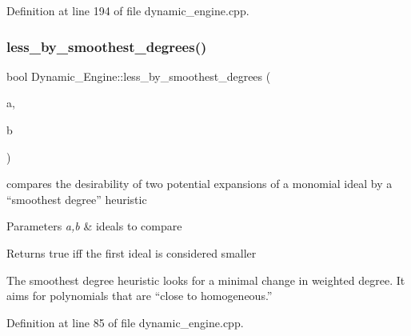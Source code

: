 Definition at line 194 of file dynamic\+\_\+engine.\+cpp.

\mbox{\label{namespace_dynamic___engine_aa27b3fbb646d1d0f5d35de5a69e1cb29}} 
\subsubsection{\texorpdfstring{less\+\_\+by\+\_\+smoothest\+\_\+degrees()}{less\_by\_smoothest\_degrees()}}
{\footnotesize\ttfamily bool Dynamic\+\_\+\+Engine\+::less\+\_\+by\+\_\+smoothest\+\_\+degrees (\begin{DoxyParamCaption}\item[{\hyperlink{group___g_b_computation_class_dynamic___engine_1_1_p_p___with___ideal}{P\+P\+\_\+\+With\+\_\+\+Ideal} \&}]{a,  }\item[{\hyperlink{group___g_b_computation_class_dynamic___engine_1_1_p_p___with___ideal}{P\+P\+\_\+\+With\+\_\+\+Ideal} \&}]{b }\end{DoxyParamCaption})}



compares the desirability of two potential expansions of a monomial ideal by a ``smoothest degree'' heuristic 


\begin{DoxyParams}{Parameters}
{\em a,b} & ideals to compare \\
\hline
\end{DoxyParams}
\begin{DoxyReturn}{Returns}
{\ttfamily true} iff the first ideal is considered smaller
\end{DoxyReturn}
The smoothest degree heuristic looks for a minimal change in weighted degree. It aims for polynomials that are ``close to homogeneous.'' 

Definition at line 85 of file dynamic\+\_\+engine.\+cpp.

\mbox{\label{namespace_dynamic___engine_a06310dff730cbb5b133b3c907ceb6053}} 
